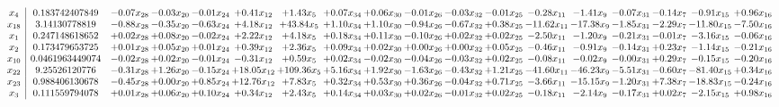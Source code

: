 \documentclass[9pt]{article}
\begin{document}
 \[\begin{array}{c| c c@{\hskip 2pt} c@{\hskip 2pt} c@{\hskip 2pt} c@{\hskip 2pt} c@{\hskip 2pt} c@{\hskip 2pt} c@{\hskip 2pt} c@{\hskip 2pt} c@{\hskip 2pt} c@{\hskip 2pt} c@{\hskip 2pt} c@{\hskip 2pt} c@{\hskip 2pt} c@{\hskip 2pt} c@{\hskip 2pt} c@{\hskip 2pt} }
 x_{4}   &  0.183742407849 & -0.07 x_{28} & -0.03 x_{20} & -0.01 x_{24} & +  0.41 x_{12} & +  1.43 x_{5} & +  0.07 x_{34} & +  0.06 x_{30} & -0.01 x_{26} & -0.03 x_{32} & -0.01 x_{25} & -0.28 x_{11} & -1.41 x_{9} & -0.07 x_{31} & -0.14 x_{7} & -0.91 x_{15} & +  0.96 x_{16}\\
 x_{18}   &  3.14130778819 & -0.88 x_{28} & -0.35 x_{20} & -0.63 x_{24} & +  4.18 x_{12} & + 43.84 x_{5} & +  1.10 x_{34} & +  1.10 x_{30} & -0.94 x_{26} & -0.67 x_{32} & +  0.38 x_{25} & -11.62 x_{11} & -17.38 x_{9} & -1.85 x_{31} & -2.29 x_{7} & -11.80 x_{15} & -7.50 x_{16}\\
 x_{1}   &  0.247148618652 & +  0.02 x_{28} & +  0.08 x_{20} & -0.02 x_{24} & +  2.22 x_{12} & +  4.18 x_{5} & +  0.18 x_{34} & +  0.11 x_{30} & -0.10 x_{26} & +  0.02 x_{32} & +  0.02 x_{25} & -2.50 x_{11} & -1.20 x_{9} & -0.21 x_{31} & -0.01 x_{7} & -3.16 x_{15} & -0.06 x_{16}\\
 x_{2}   &  0.173479653725 & +  0.01 x_{28} & +  0.05 x_{20} & +  0.01 x_{24} & +  0.39 x_{12} & +  2.36 x_{5} & +  0.09 x_{34} & +  0.02 x_{30} & +  0.00 x_{26} & +  0.00 x_{32} & +  0.05 x_{25} & -0.46 x_{11} & -0.91 x_{9} & -0.14 x_{31} & +  0.23 x_{7} & -1.14 x_{15} & -0.21 x_{16}\\
 x_{10}   &  0.0461963449074 & -0.02 x_{28} & +  0.02 x_{20} & -0.01 x_{24} & -0.31 x_{12} & +  0.59 x_{5} & +  0.02 x_{34} & -0.02 x_{30} & -0.04 x_{26} & -0.03 x_{32} & +  0.02 x_{25} & -0.08 x_{11} & -0.02 x_{9} & -0.00 x_{31} & +  0.29 x_{7} & -0.15 x_{15} & -0.20 x_{16}\\
 x_{22}   &  9.25526120776 & -0.31 x_{28} & +  1.26 x_{20} & -0.15 x_{24} & + 18.05 x_{12} & + 109.36 x_{5} & +  5.16 x_{34} & +  1.92 x_{30} & -1.63 x_{26} & -0.43 x_{32} & +  1.21 x_{25} & -41.60 x_{11} & -46.23 x_{9} & -5.51 x_{31} & -0.60 x_{7} & -81.40 x_{15} & +  0.34 x_{16}\\
 x_{23}   &  0.988406130678 & -0.45 x_{28} & +  0.00 x_{20} & +  0.85 x_{24} & + 12.76 x_{12} & +  7.83 x_{5} & +  0.32 x_{34} & +  0.53 x_{30} & +  0.36 x_{26} & -0.04 x_{32} & +  0.71 x_{25} & -3.66 x_{11} & -15.15 x_{9} & -1.20 x_{31} & +  7.38 x_{7} & -18.83 x_{15} & -0.24 x_{16}\\
 x_{3}   &  0.111559794078 & +  0.01 x_{28} & +  0.06 x_{20} & +  0.10 x_{24} & +  0.34 x_{12} & +  2.43 x_{5} & +  0.14 x_{34} & +  0.03 x_{30} & +  0.02 x_{26} & -0.01 x_{32} & +  0.02 x_{25} & -0.18 x_{11} & -2.14 x_{9} & -0.17 x_{31} & +  0.02 x_{7} & -2.15 x_{15} & +  0.98 x_{16}\\

\end{array}\]
\end{document}
